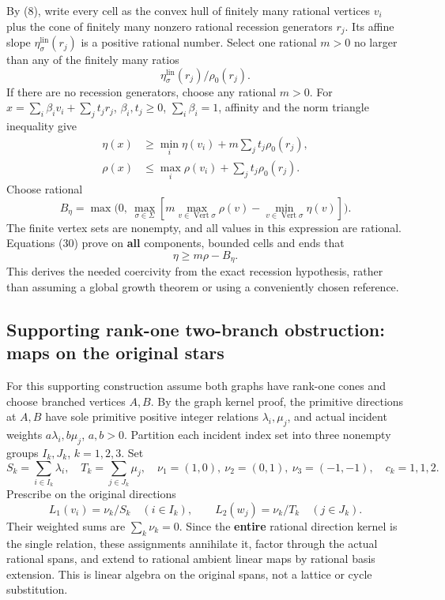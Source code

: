 \documentclass[
  11pt,
]{article}
\begin{document}
By (8), write every cell as the convex hull of finitely many rational
vertices \(v_i\) plus the cone of finitely many nonzero rational
recession generators \(r_j\). Its affine slope
\(\eta_\sigma^{\mathrm{lin}}(r_j)\) is a positive rational number.
Select one rational \(m>0\) no larger than any of the finitely many
ratios \[
       \eta_\sigma^{\mathrm{lin}}(r_j)/\rho_0(r_j).            \tag{29}
\] If there are no recession generators, choose any rational \(m>0\).
For \(x=\sum_i\beta_iv_i+\sum_jt_jr_j\), \(\beta_i,t_j\geq0\),
\(\sum_i\beta_i=1\), affinity and the norm triangle inequality give \[
\begin{split}
\eta(x)&\geq\min_i\eta(v_i)+m\sum_jt_j\rho_0(r_j),\\
\rho(x)&\leq\max_i\rho(v_i)+\sum_jt_j\rho_0(r_j).
\end{split}                                                        \tag{30}
\] Choose rational \[
B_{\eta}=\max\bigl(0,\ \max_{\sigma\in\Sigma}
                 [m\max_{v\in\operatorname{Vert}\sigma}\rho(v)
                        -\min_{v\in\operatorname{Vert}\sigma}\eta(v)]\bigr).
\] The finite vertex sets are nonempty, and all values in this
expression are rational. Equations (30) prove on \textbf{all}
components, bounded cells and ends that \[
                         \eta\geq m\rho-B_{\eta}.                 \tag{31}
\] This derives the needed coercivity from the exact recession
hypothesis, rather than assuming a global growth theorem or using a
conveniently chosen reference.

\subsection{Supporting rank-one two-branch obstruction: maps on the
original
stars}\label{supporting-rank-one-two-branch-obstruction-maps-on-the-original-stars}

For this supporting construction assume both graphs have rank-one cones
and choose branched vertices \(A,B\). By the graph kernel proof, the
primitive directions at \(A,B\) have sole primitive positive integer
relations \(\lambda_i,\mu_j\), and actual incident weights
\(a\lambda_i,b\mu_j\), \(a,b>0\). Partition each incident index set into
three nonempty groups \(I_k,J_k\), \(k=1,2,3\). Set \[
 S_k=\sum_{i\in I_k}\lambda_i,\quad T_k=\sum_{j\in J_k}\mu_j,
 \quad\nu_1=(1,0),\ \nu_2=(0,1),\ \nu_3=(-1,-1),\quad c_k=1,1,2.
\] Prescribe on the original directions \[
L_1(v_i)=\nu_k/S_k\quad(i\in I_k),\qquad
L_2(w_j)=\nu_k/T_k\quad(j\in J_k).                            \tag{32}
\] Their weighted sums are \(\sum_k\nu_k=0\). Since the \textbf{entire}
rational direction kernel is the single relation, these assignments
annihilate it, factor through the actual rational spans, and extend to
rational ambient linear maps by rational basis extension. This is linear
algebra on the original spans, not a lattice or cycle substitution.
\end{document}
